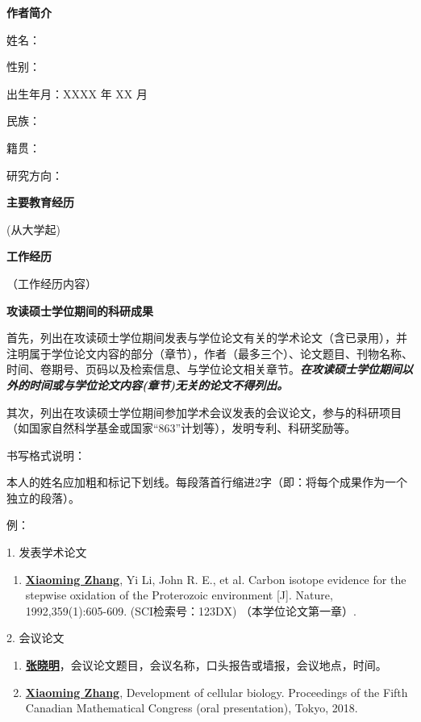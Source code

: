 
\begin{achievement}

{\bf 作者简介}

姓名：

性别：

出生年月：XXXX 年 XX 月

民族：

籍贯：

研究方向：

{\bf 主要教育经历}

(从大学起)

{\bf 工作经历}

（工作经历内容）

{\bf 攻读硕士学位期间的科研成果}

首先，列出在攻读硕士学位期间发表与学位论文有关的学术论文（含已录用），并注明属于学位论文内容的部分（章节），作者（最多三个）、论文题目、刊物名称、时间、卷期号、页码以及检索信息、与学位论文相关章节。{\bf\itshape 在攻读硕士学位期间以外的时间或与学位论文内容(章节)无关的论文不得列出。}

其次，列出在攻读硕士学位期间参加学术会议发表的会议论文，参与的科研项目（如国家自然科学基金或国家“863”计划等），发明专利、科研奖励等。

书写格式说明：

本人的姓名应加粗和标记下划线。每段落首行缩进2字（即：将每个成果作为一个独立的段落）。

例：

1. 发表学术论文
\begin{enumerate}[nosep, label=$\lbrack$\arabic*$\rbrack$]
  \item{\underline{\bf Xiaoming Zhang}, Yi Li, John R. E., et al. Carbon isotope evidence for the stepwise oxidation of the Proterozoic environment [J]. Nature, 1992,359(1):605-609. (SCI检索号：123DX) （本学位论文第一章）.}
\end{enumerate}{}\vspace{1em}

2. 会议论文
\begin{enumerate}[nosep, label=$\lbrack$\arabic*$\rbrack$]
  \item{\underline{\bf 张晓明}，会议论文题目，会议名称，口头报告或墙报，会议地点，时间。}
  \item{\underline{\bf Xiaoming Zhang}, Development of cellular biology. Proceedings of the Fifth Canadian Mathematical Congress (oral presentation), Tokyo, 2018.}
\end{enumerate}{}\vspace{1em}


\end{achievement}
